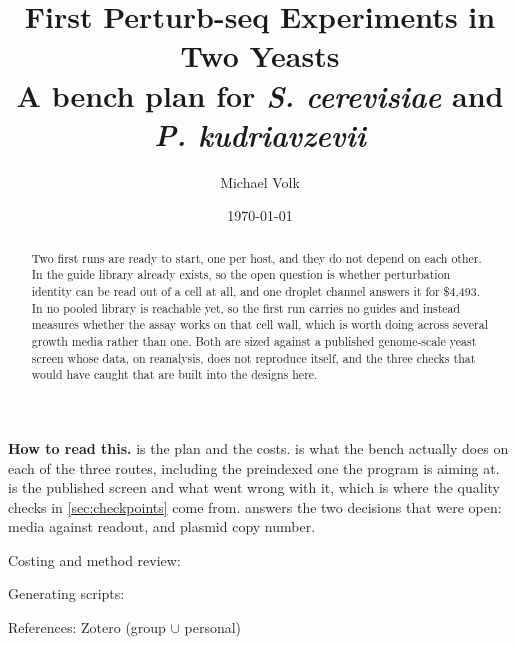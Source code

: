 \documentclass[10pt,a4paper]{article}
\title{\vspace{-1.5em}First Perturb-seq Experiments in Two Yeasts\\
  {\large A bench plan for \textit{S. cerevisiae} and \textit{P. kudriavzevii}}}
\author{Michael Volk}
\date{\today}
\begin{document}
\maketitle
\thispagestyle{empty}

\begin{abstract}
\noindent
Two first runs are ready to start, one per host, and they do not depend on each
other. In  the guide library already exists, so the open
question is whether perturbation identity can be read out of a cell at all, and
one droplet channel answers it for \$4{,}493. In  no
pooled library is reachable yet, so the first run carries no guides and instead
measures whether the assay works on that cell wall, which is worth doing across
several growth media rather than one. Both are sized against a published
genome-scale yeast screen whose data, on reanalysis, does not reproduce itself,
and the three checks that would have caught that are built into the designs
here.
\end{abstract}

\vspace{0.5em}
{\small\color{tcgray}
\textbf{How to read this.}  is the plan and the costs.
 is what the bench actually does on each of the three
routes, including the preindexed one the program is aiming at.
 is the published screen and what went wrong with it, which is
where the quality checks in \cref{sec:checkpoints} come from. 
answers the two decisions that were open: media against readout, and plasmid
copy number.\par\smallskip

Costing and method review: \par
Generating scripts: \par
References: Zotero  (group $\cup$ personal)\par}

\vspace{1em}
\tccontents







\clearpage
\small

\end{document}
